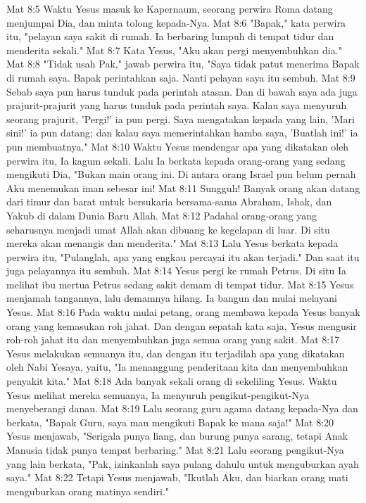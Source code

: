 Mat 8:5  Waktu Yesus masuk ke Kapernaum, seorang perwira Roma datang menjumpai Dia, dan minta tolong kepada-Nya.
Mat 8:6  "Bapak," kata perwira itu, "pelayan saya sakit di rumah. Ia berbaring lumpuh di tempat tidur dan menderita sekali."
Mat 8:7  Kata Yesus, "Aku akan pergi menyembuhkan dia."
Mat 8:8  "Tidak usah Pak," jawab perwira itu, "Saya tidak patut menerima Bapak di rumah saya. Bapak perintahkan saja. Nanti pelayan saya itu sembuh.
Mat 8:9  Sebab saya pun harus tunduk pada perintah atasan. Dan di bawah saya ada juga prajurit-prajurit yang harus tunduk pada perintah saya. Kalau saya menyuruh seorang prajurit, 'Pergi!' ia pun pergi. Saya mengatakan kepada yang lain, 'Mari sini!' ia pun datang; dan kalau saya memerintahkan hamba saya, 'Buatlah ini!' ia pun membuatnya."
Mat 8:10  Waktu Yesus mendengar apa yang dikatakan oleh perwira itu, Ia kagum sekali. Lalu Ia berkata kepada orang-orang yang sedang mengikuti Dia, "Bukan main orang ini. Di antara orang Israel pun belum pernah Aku menemukan iman sebesar ini!
Mat 8:11  Sungguh! Banyak orang akan datang dari timur dan barat untuk bersukaria bersama-sama Abraham, Ishak, dan Yakub di dalam Dunia Baru Allah.
Mat 8:12  Padahal orang-orang yang seharusnya menjadi umat Allah akan dibuang ke kegelapan di luar. Di situ mereka akan menangis dan menderita."
Mat 8:13  Lalu Yesus berkata kepada perwira itu, "Pulanglah, apa yang engkau percayai itu akan terjadi." Dan saat itu juga pelayannya itu sembuh.
Mat 8:14  Yesus pergi ke rumah Petrus. Di situ Ia melihat ibu mertua Petrus sedang sakit demam di tempat tidur.
Mat 8:15  Yesus menjamah tangannya, lalu demamnya hilang. Ia bangun dan mulai melayani Yesus.
Mat 8:16  Pada waktu mulai petang, orang membawa kepada Yesus banyak orang yang kemasukan roh jahat. Dan dengan sepatah kata saja, Yesus mengusir roh-roh jahat itu dan menyembuhkan juga semua orang yang sakit.
Mat 8:17  Yesus melakukan semuanya itu, dan dengan itu terjadilah apa yang dikatakan oleh Nabi Yesaya, yaitu, "Ia menanggung penderitaan kita dan menyembuhkan penyakit kita."
Mat 8:18  Ada banyak sekali orang di sekeliling Yesus. Waktu Yesus melihat mereka semuanya, Ia menyuruh pengikut-pengikut-Nya menyeberangi danau.
Mat 8:19  Lalu seorang guru agama datang kepada-Nya dan berkata, "Bapak Guru, saya mau mengikuti Bapak ke mana saja!"
Mat 8:20  Yesus menjawab, "Serigala punya liang, dan burung punya sarang, tetapi Anak Manusia tidak punya tempat berbaring."
Mat 8:21  Lalu seorang pengikut-Nya yang lain berkata, "Pak, izinkanlah saya pulang dahulu untuk menguburkan ayah saya."
Mat 8:22  Tetapi Yesus menjawab, "Ikutlah Aku, dan biarkan orang mati menguburkan orang matinya sendiri."
